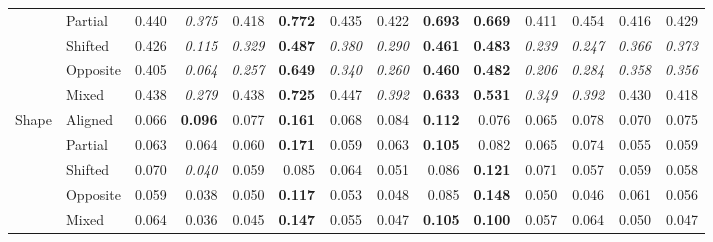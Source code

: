 \begin{tabular}{@{}llrrrrrrrrrrrr@{}}
 & Partial & 0.440 & \textit{0.375} & 0.418 & \textbf{0.772} & 0.435 & 0.422 & \textbf{0.693} & \textbf{0.669} & 0.411 & 0.454 & 0.416 & 0.429\\
 & Shifted & 0.426 & \textit{0.115} & \textit{0.329} & \textbf{0.487} & \textit{0.380} & \textit{0.290} & \textbf{0.461} & \textbf{0.483} & \textit{0.239} & \textit{0.247} & \textit{0.366} & \textit{0.373}\\
 & Opposite & 0.405 & \textit{0.064} & \textit{0.257} & \textbf{0.649} & \textit{0.340} & \textit{0.260} & \textbf{0.460} & \textbf{0.482} & \textit{0.206} & \textit{0.284} & \textit{0.358} & \textit{0.356}\\
 & Mixed & 0.438 & \textit{0.279} & 0.438 & \textbf{0.725} & 0.447 & \textit{0.392} & \textbf{0.633} & \textbf{0.531} & \textit{0.349} & \textit{0.392} & 0.430 & 0.418\\
\addlinespace[2pt]
Shape & Aligned & 0.066 & \textbf{0.096} & 0.077 & \textbf{0.161} & 0.068 & 0.084 & \textbf{0.112} & 0.076 & 0.065 & 0.078 & 0.070 & 0.075\\
 & Partial & 0.063 & 0.064 & 0.060 & \textbf{0.171} & 0.059 & 0.063 & \textbf{0.105} & 0.082 & 0.065 & 0.074 & 0.055 & 0.059\\
 & Shifted & 0.070 & \textit{0.040} & 0.059 & 0.085 & 0.064 & 0.051 & 0.086 & \textbf{0.121} & 0.071 & 0.057 & 0.059 & 0.058\\
 & Opposite & 0.059 & 0.038 & 0.050 & \textbf{0.117} & 0.053 & 0.048 & 0.085 & \textbf{0.148} & 0.050 & 0.046 & 0.061 & 0.056\\
 & Mixed & 0.064 & 0.036 & 0.045 & \textbf{0.147} & 0.055 & 0.047 & \textbf{0.105} & \textbf{0.100} & 0.057 & 0.064 & 0.050 & 0.047\\
\bottomrule
\end{tabular}